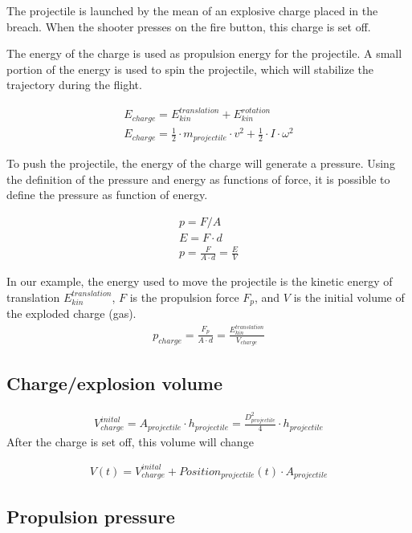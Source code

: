 \documentclass[12pt,a4paper]{article}
\begin{document}
The projectile is launched by the mean of an explosive charge placed in the breach. 
When the shooter presses on the fire button, this charge is set off. 

The energy of the charge is used as propulsion energy for the projectile. A small portion of the energy is used to spin the projectile, which will stabilize the trajectory during the flight. 

\begin{eqnarray}
	E_{charge} = E_{kin}^{translation} + E_{kin}^{rotation} \\
	E_{charge} = \frac{1}{2} \cdot m_{projectile} \cdot v^2 + \frac{1}{2} \cdot I \cdot \omega ^ 2
\end{eqnarray}

To push the projectile, the energy of the charge will generate a pressure. Using the definition of the pressure and energy as functions of force, it is possible to define the pressure as function of energy. 

\begin{eqnarray}
	p = F/A \\
	E = F \cdot d \\
	p = \frac{F}{A \cdot d} = \frac{E}{V}
\end{eqnarray}

In our example, the energy used to move the projectile is the kinetic energy of translation $E_{kin}^{translation}$, $F$ is the propulsion force $F_p$, and $V$ is the initial volume of the exploded charge (gas).
\begin{eqnarray}
	p_{charge} = \frac{F_p}{A \cdot d} = \frac{E_{kin}^{translation}}{V_{charge}}
\end{eqnarray}

\subsection{Charge/explosion volume}
\begin{eqnarray}
	V_{charge}^{inital} = A_{ projectile} \cdot h_{projectile} =  \frac{D_{projectile}^2}{4} \cdot h_{projectile}
\end{eqnarray}
After the charge is set off, this volume will change

\begin{eqnarray}
	V(t) = V_{charge}^{inital} + Position_{projectile}(t) \cdot A_{projectile}
\end{eqnarray}

\subsection{Propulsion pressure}
\end{document}
